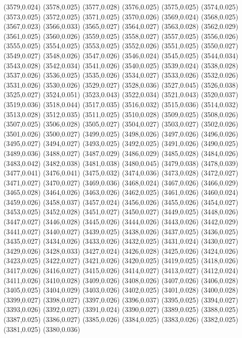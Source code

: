 (3579,0.024)
(3578,0.025)
(3577,0.028)
(3576,0.025)
(3575,0.025)
(3574,0.025)
(3573,0.025)
(3572,0.025)
(3571,0.025)
(3570,0.026)
(3569,0.024)
(3568,0.025)
(3567,0.023)
(3566,0.033)
(3565,0.027)
(3564,0.027)
(3563,0.028)
(3562,0.029)
(3561,0.025)
(3560,0.026)
(3559,0.025)
(3558,0.027)
(3557,0.025)
(3556,0.026)
(3555,0.025)
(3554,0.025)
(3553,0.025)
(3552,0.026)
(3551,0.025)
(3550,0.027)
(3549,0.027)
(3548,0.026)
(3547,0.026)
(3546,0.024)
(3545,0.025)
(3544,0.034)
(3543,0.028)
(3542,0.034)
(3541,0.026)
(3540,0.025)
(3539,0.024)
(3538,0.028)
(3537,0.026)
(3536,0.025)
(3535,0.026)
(3534,0.027)
(3533,0.026)
(3532,0.026)
(3531,0.026)
(3530,0.026)
(3529,0.027)
(3528,0.036)
(3527,0.045)
(3526,0.038)
(3525,0.027)
(3524,0.051)
(3523,0.043)
(3522,0.034)
(3521,0.043)
(3520,0.037)
(3519,0.036)
(3518,0.044)
(3517,0.035)
(3516,0.032)
(3515,0.036)
(3514,0.032)
(3513,0.028)
(3512,0.035)
(3511,0.025)
(3510,0.028)
(3509,0.025)
(3508,0.026)
(3507,0.025)
(3506,0.028)
(3505,0.027)
(3504,0.027)
(3503,0.027)
(3502,0.026)
(3501,0.026)
(3500,0.027)
(3499,0.025)
(3498,0.026)
(3497,0.026)
(3496,0.026)
(3495,0.027)
(3494,0.027)
(3493,0.025)
(3492,0.025)
(3491,0.026)
(3490,0.025)
(3489,0.036)
(3488,0.027)
(3487,0.029)
(3486,0.029)
(3485,0.028)
(3484,0.026)
(3483,0.042)
(3482,0.038)
(3481,0.038)
(3480,0.045)
(3479,0.038)
(3478,0.039)
(3477,0.041)
(3476,0.041)
(3475,0.032)
(3474,0.036)
(3473,0.028)
(3472,0.027)
(3471,0.027)
(3470,0.027)
(3469,0.036)
(3468,0.024)
(3467,0.026)
(3466,0.029)
(3465,0.028)
(3464,0.026)
(3463,0.026)
(3462,0.025)
(3461,0.026)
(3460,0.024)
(3459,0.026)
(3458,0.037)
(3457,0.024)
(3456,0.026)
(3455,0.026)
(3454,0.027)
(3453,0.025)
(3452,0.028)
(3451,0.027)
(3450,0.027)
(3449,0.025)
(3448,0.026)
(3447,0.027)
(3446,0.028)
(3445,0.026)
(3444,0.026)
(3443,0.026)
(3442,0.029)
(3441,0.027)
(3440,0.027)
(3439,0.025)
(3438,0.026)
(3437,0.025)
(3436,0.025)
(3435,0.027)
(3434,0.026)
(3433,0.026)
(3432,0.025)
(3431,0.024)
(3430,0.027)
(3429,0.026)
(3428,0.033)
(3427,0.024)
(3426,0.028)
(3425,0.026)
(3424,0.026)
(3423,0.025)
(3422,0.027)
(3421,0.026)
(3420,0.025)
(3419,0.025)
(3418,0.026)
(3417,0.026)
(3416,0.027)
(3415,0.026)
(3414,0.027)
(3413,0.027)
(3412,0.024)
(3411,0.026)
(3410,0.028)
(3409,0.026)
(3408,0.026)
(3407,0.026)
(3406,0.028)
(3405,0.025)
(3404,0.029)
(3403,0.026)
(3402,0.025)
(3401,0.028)
(3400,0.028)
(3399,0.027)
(3398,0.027)
(3397,0.026)
(3396,0.037)
(3395,0.025)
(3394,0.027)
(3393,0.026)
(3392,0.027)
(3391,0.024)
(3390,0.027)
(3389,0.025)
(3388,0.025)
(3387,0.025)
(3386,0.027)
(3385,0.026)
(3384,0.025)
(3383,0.026)
(3382,0.025)
(3381,0.025)
(3380,0.036)
